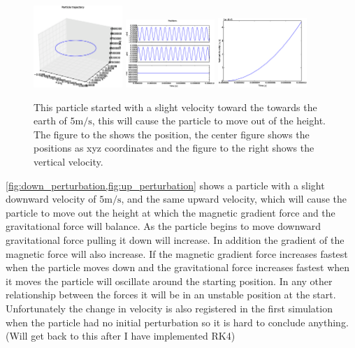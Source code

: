 \documentclass[x11names]{article}
\begin{document}
  \begin{figure}
      \centering
      \includegraphics[width = 0.30\textwidth]{figures/7_5_12_3Dplot}
      \includegraphics[width = 0.30\textwidth]{figures/7_5_12_xyz}
      \includegraphics[width = 0.30\textwidth]{figures/7_5_12_vertical_vel}
      \caption{ This particle started with a slight velocity toward the towards the earth of \(5 \si{\meter\per\second}\), this will cause the particle to move out of the height. The figure to the shows the position, the center figure shows the positions as xyz coordinates and the figure to the right shows the vertical velocity.}
      \label{fig:up_perturbation}
   \end{figure}

  \cref{fig:down_perturbation,fig:up_perturbation} shows a particle with a slight downward velocity of \(5 \si{\meter\per\second}\), and the same upward velocity, which will cause the particle to move out the height at which the magnetic gradient force and the gravitational force will balance. As the particle begins to move downward gravitational force pulling it down will increase. In addition the gradient of the magnetic force will also increase. If the magnetic gradient force increases fastest when the particle moves down and the gravitational force increases fastest when it moves the particle will oscillate around the starting position. In any other relationship between the forces it will be in an unstable position at the start. Unfortunately the change in velocity is also registered in the first simulation when the particle had no initial perturbation so it is hard to conclude anything. (Will get back to this after I have implemented RK4)
\end{document}
